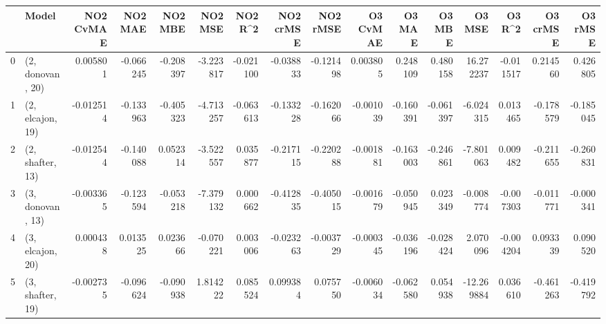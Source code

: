 \begin{tabular}{llrrrrrrrrrrrrrr}
\toprule
{} &             Model &  NO2 CvMAE &   NO2 MAE &   NO2 MBE &   NO2 MSE &   NO2 R\textasciicircum2 &  NO2 crMSE &  NO2 rMSE &  O3 CvMAE &    O3 MAE &    O3 MBE &     O3 MSE &    O3 R\textasciicircum2 &  O3 crMSE &   O3 rMSE \\
\midrule
0 &  (2, donovan, 20) &   0.005801 & -0.066245 & -0.208397 & -3.223817 & -0.021100 &  -0.038833 & -0.121498 &  0.003805 &  0.248109 &  0.480158 &  16.272237 & -0.011517 &  0.214560 &  0.426805 \\
1 &  (2, elcajon, 19) &  -0.012514 & -0.133963 & -0.405323 & -4.713257 & -0.063613 &  -0.133228 & -0.162066 & -0.001039 & -0.160391 & -0.061397 &  -6.024315 &  0.013465 & -0.178579 & -0.185045 \\
2 &  (2, shafter, 13) &  -0.012544 & -0.140088 &  0.052314 & -3.522557 &  0.035877 &  -0.217115 & -0.220288 & -0.001881 & -0.163003 & -0.246861 &  -7.801063 &  0.009482 & -0.211655 & -0.260831 \\
3 &  (3, donovan, 13) &  -0.003365 & -0.123594 & -0.053218 & -7.379132 &  0.000662 &  -0.412835 & -0.405015 & -0.001679 & -0.050945 &  0.023349 &  -0.008774 & -0.007303 & -0.011771 & -0.000341 \\
4 &  (3, elcajon, 20) &   0.000438 &  0.013525 &  0.023666 & -0.070221 &  0.003006 &  -0.023263 & -0.003729 & -0.000345 & -0.036196 & -0.028424 &   2.070096 & -0.004204 &  0.093339 &  0.090520 \\
5 &  (3, shafter, 19) &  -0.002735 & -0.096624 & -0.090938 &  1.814222 &  0.085524 &   0.099384 &  0.075750 & -0.006034 & -0.062580 &  0.054938 & -12.269884 &  0.036610 & -0.461263 & -0.419792 \\
\bottomrule
\end{tabular}

